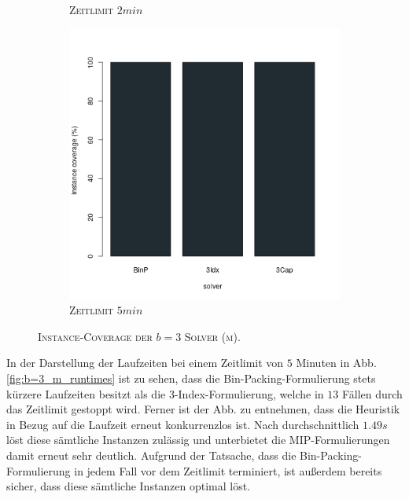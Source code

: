 \begin{figure}[H]
\begin{subfigure}[b]{0.3\textwidth}
\caption{\textsc{Zeitlimit} $2min$}
\label{fig:instance_coverage_b=3_m_b}
\end{subfigure}
\hfill
\begin{subfigure}[b]{0.3\textwidth}
\centering
\includegraphics[width=1.2\textwidth]{img/solver_instance_coverage_b=3_m_300s.png}
\caption{\textsc{Zeitlimit} $5min$}
\label{fig:instance_coverage_b=3_m_c}
\end{subfigure}
\caption{\textsc{Instance-Coverage der $b = 3$ Solver (m)}.}
\label{fig:instance_coverage_b=3_m}
\end{figure}

In der Darstellung der Laufzeiten bei einem Zeitlimit von $5$ Minuten in Abb. \ref{fig:b=3_m_runtimes} ist zu sehen, dass die Bin-Packing-Formulierung stets kürzere Laufzeiten besitzt als die 3-Index-Formulierung, welche in $13$ Fällen durch das Zeitlimit gestoppt wird. Ferner ist der Abb. zu entnehmen, dass die Heuristik in Bezug auf die Laufzeit erneut konkurrenzlos ist. Nach durchschnittlich $1.49s$ löst diese sämtliche Instanzen zulässig und unterbietet die MIP-Formulierungen damit erneut sehr deutlich. Aufgrund der Tatsache, dass die Bin-Packing-Formulierung in jedem Fall
vor dem Zeitlimit terminiert, ist außerdem bereits sicher, dass diese sämtliche Instanzen optimal löst.

